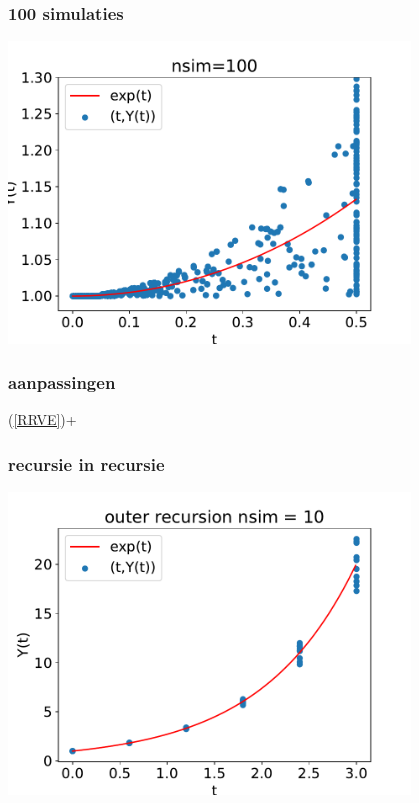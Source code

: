 \documentclass[20pt]{beamer}
\begin{document}
\begin{frame}
    \frametitle{100 simulaties}
    \begin{center}
        \includegraphics[width=0.8\textwidth]{100iter.pdf}
    \end{center}
\end{frame}

\begin{frame}
    \frametitle{aanpassingen}
    \vspace{-2cm}
    \action<+->{}
    (\ref{RRVE})+
    \begin{itemize}
    \end{itemize}
\end{frame}

\begin{frame}
    \frametitle{recursie in recursie}
    \begin{center}
        \includegraphics[width=0.8\textwidth]{outer recursion.pdf}
    \end{center}
\end{frame}
\end{document}

